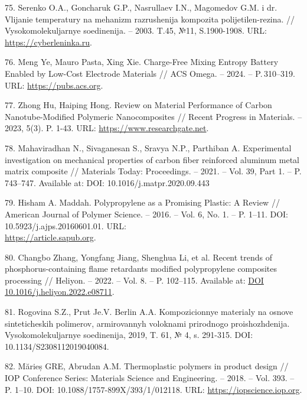 \begin{references}
75. Serenko O.A., Goncharuk G.P., Nasrullaev I.N., Magomedov G.M. i
dr. Vlijanie temperatury na mehanizm razrushenija kompozita
polijetilen-rezina. // Vysokomolekuljarnye soedinenija. – 2003. T.45,
№11,
S.1900-1908. URL: \href{https://cyberleninka.ru/article/n/vliyanie-temperatury-na-mehanizm-razrusheniya-kompozita-polietilen-rezina?utm_source}{https://cyberleninka.ru}.

76. Meng Ye, Mauro Pasta, Xing Xie. Charge-Free Mixing Entropy Battery
Enabled by Low-Cost Electrode Materials // ACS Omega. – 2024. –
P. 310–319. URL: \href{https://pubs.acs.org/doi/10.1021/acsomega.9b00863}{https://pubs.acs.org}.

77. Zhong Hu, Haiping Hong. Review on Material Performance of Carbon
Nanotube-Modified Polymeric Nanocomposites // Recent Progress in
Materials. – 2023,
5(3). P. 1-43. URL: \href{https://www.researchgate.net/publication/373330869_Review_on_Material_Performance_of_Carbon_Nanotube-Modified_Polymeric_Nanocomposites}{https://www.researchgate.net}.

78. Mahaviradhan N., Sivaganesan S., Sravya N.P., Parthiban
A. Experimental investigation on mechanical properties of carbon fiber
reinforced aluminum metal matrix composite // Materials Today:
Proceedings. – 2021. – Vol. 39, Part 1. – P. 743–747. Available at:
DOI: 10.1016/j.matpr.2020.09.443

79. Hisham A. Maddah. Polypropylene as a Promising Plastic: A Review
// American Journal of Polymer Science. – 2016. – Vol. 6, No. 1. –
P. 1–11. DOI:
10.5923/j.ajps.20160601.01. URL: \\\href{https://article.sapub.org/10.5923.j.ajps.20160601.01.html}{https://article.sapub.org}.

80. Changbo Zhang, Yongfang Jiang, Shenghua Li, et al. Recent trends
of phosphorus-containing flame retardants modified polypropylene
composites processing // Heliyon. – 2022. – Vol. 8. –
P. 102–115. Available
at: \href{https://doi.org/10.1016/j.heliyon.2022.e08711}{DOI 10.1016/j.heliyon.2022.e08711}.

81. Rogovina S.Z., Prut Je.V. Berlin A.A. Kompozicionnye materialy na
osnove sinteticheskih polimerov, armirovannyh voloknami prirodnogo
proishozhdenija. Vysokomolekuljarnye soedinenija, 2019, T. 61, № 4,
s. 291-315. DOI: 10.1134/S2308112019040084.

82. Mărieș GRE, Abrudan A.M. Thermoplastic polymers in product design
// IOP Conference Series: Materials Science and Engineering. – 2018. –
Vol. 393. – P. 1–10. DOI:
10.1088/1757-899X/393/1/012118. URL: \href{https://iopscience.iop.org/article/10.1088/1757-899X/393/1/012118}{https://iopscience.iop.org}.


\end{references}

